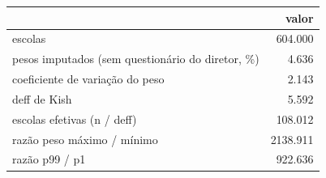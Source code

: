 \begin{tabular}{lr}
\toprule
 & valor \\
\midrule
escolas & 604.000 \\
pesos imputados (sem questionário do diretor, \%) & 4.636 \\
coeficiente de variação do peso & 2.143 \\
deff de Kish & 5.592 \\
escolas efetivas (n / deff) & 108.012 \\
razão peso máximo / mínimo & 2138.911 \\
razão p99 / p1 & 922.636 \\
\bottomrule
\end{tabular}
